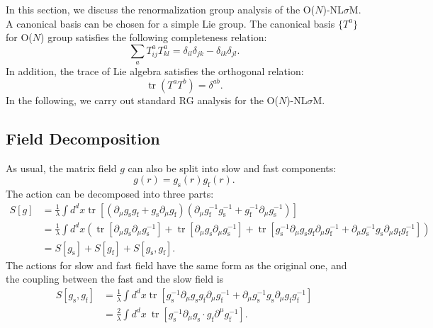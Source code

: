 \documentclass[aps,prb,superscriptaddress,nofootinbib]{revtex4}
\def \tr{\operatorname{tr}}
\begin{document}
In this section, we discuss the renormalization group analysis of the O($N$)-NL$\sigma$M.
A canonical basis can be chosen for a simple Lie group.
The canonical basis $\{T^a\}$ for O($N$) group satisfies the following completeness relation:
\begin{equation}\label{eq:com-rel}
	\sum_{a} T_{i j}^{a} T_{k l}^{a} =\delta_{i l} \delta_{j k}-\delta_{i k} \delta_{j l}.
\end{equation} 
In addition, the trace of Lie algebra satisfies the orthogonal relation:
\begin{equation}
	\tr\left(T^{a} T^{b}\right)=\delta^{a b}.
\end{equation}
In the following, we carry out standard RG analysis for the O($N$)-NL$\sigma$M.



\subsection{Field Decomposition}
As usual, the matrix field $g$ can also be split into slow and fast components:
\begin{equation}
	g(r) = g_{\mathrm{s}}(r) g_{\mathrm{f}}(r).
\end{equation}
The action can be decomposed into three parts:
\begin{equation}
\begin{aligned}
	S[g] &= \frac{1}{\lambda}\int d^d x \tr[(\partial_\mu g_{\mathrm{s}} g_{\mathrm{f}} + g_{\mathrm{s}} \partial_\mu g_{\mathrm{f}})(\partial_\mu g_{\mathrm{f}}^{-1} g_{\mathrm{s}}^{-1}+g_{\mathrm{f}}^{-1}\partial_\mu g_{\mathrm{s}}^{-1})] \\
	&= \frac{1}{\lambda}\int d^d x\left( \tr[\partial_\mu g_{\mathrm{s}} \partial_\mu g_{\mathrm{s}}^{-1}]+\tr[\partial_\mu g_{\mathrm{s}} \partial_\mu g_{\mathrm{s}}^{-1}]+\tr[g_{\mathrm{s}}^{-1}\partial_\mu g_{\mathrm{s}} g_{\mathrm{f}} \partial_\mu g_{\mathrm{f}}^{-1}+\partial_\mu g_{\mathrm{s}}^{-1} g_{\mathrm{s}} \partial_\mu g_{\mathrm{f}} g_{\mathrm{f}}^{-1}] \right) \\
	&= S[g_{\mathrm{s}}] + S[g_{\mathrm{f}}] + S[g_{\mathrm{s}},g_{\mathrm{f}}].
\end{aligned}
\end{equation}
The actions for slow and fast field have the same form as the original one, and the coupling between the fast and the slow field is
\begin{equation}
\begin{aligned}
	S[g_{\mathrm{s}},g_{\mathrm{f}}] 
	&= \frac{1}{\lambda}\int d^d x \tr[g_{\mathrm{s}}^{-1}\partial_\mu g_{\mathrm{s}} g_{\mathrm{f}} \partial_\mu g_{\mathrm{f}}^{-1}+\partial_\mu g_{\mathrm{s}}^{-1} g_{\mathrm{s}} \partial_\mu g_{\mathrm{f}} g_{\mathrm{f}}^{-1}] \\
	&= \frac{2}{\lambda} \int d^d x\ \tr\left[g_{\mathrm{s}}^{-1}\partial_\mu g_{\mathrm{s}} \cdot g_{\mathrm{f}} \partial^\mu g_{\mathrm{f}}^{-1}\right].
\end{aligned}
\end{equation}
\end{document}
